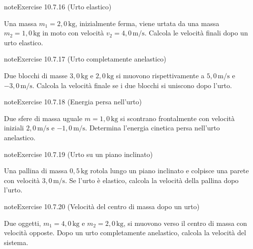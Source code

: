 \documentclass[letterpaper,10pt,italian]{jupyterBook}
\begin{document}
\begin{sphinxadmonition}{note}{Exercise 10.7.16 (Urto elastico)}



\sphinxAtStartPar
Una massa \(m_1 = 2,0 \, \text{kg}\), inizialmente ferma, viene urtata da una massa \(m_2 = 1,0 \, \text{kg}\) in moto con velocità \(v_2 = 4,0 \, \text{m/s}\). Calcola le velocità finali dopo un urto elastico.
\end{sphinxadmonition}
 \label{exercise:ch/mechanics/dynamics-problems-exercise-16}

\begin{sphinxadmonition}{note}{Exercise 10.7.17 (Urto completamente anelastico)}



\sphinxAtStartPar
Due blocchi di masse \(3,0 \, \text{kg}\) e \(2,0 \, \text{kg}\) si muovono rispettivamente a \(5,0 \, \text{m/s}\) e \(-3,0 \, \text{m/s}\). Calcola la velocità finale se i due blocchi si uniscono dopo l’urto.
\end{sphinxadmonition}
 \label{exercise:ch/mechanics/dynamics-problems-exercise-17}

\begin{sphinxadmonition}{note}{Exercise 10.7.18 (Energia persa nell’urto)}



\sphinxAtStartPar
Due sfere di massa uguale \(m = 1,0 \, \text{kg}\) si scontrano frontalmente con velocità iniziali \(2,0 \, \text{m/s}\) e \(-1,0 \, \text{m/s}\). Determina l’energia cinetica persa nell’urto anelastico.
\end{sphinxadmonition}
 \label{exercise:ch/mechanics/dynamics-problems-exercise-18}

\begin{sphinxadmonition}{note}{Exercise 10.7.19 (Urto su un piano inclinato)}



\sphinxAtStartPar
Una pallina di massa \(0,5 \, \text{kg}\) rotola lungo un piano inclinato e colpisce una parete con velocità \(3,0 \, \text{m/s}\). Se l’urto è elastico, calcola la velocità della pallina dopo l’urto.
\end{sphinxadmonition}
 \label{exercise:ch/mechanics/dynamics-problems-exercise-19}

\begin{sphinxadmonition}{note}{Exercise 10.7.20 (Velocità del centro di massa dopo un urto)}



\sphinxAtStartPar
Due oggetti, \(m_1 = 4,0 \, \text{kg}\) e \(m_2 = 2,0 \, \text{kg}\), si muovono verso il centro di massa con velocità opposte. Dopo un urto completamente anelastico, calcola la velocità del sistema.
\end{sphinxadmonition}
\end{document}

